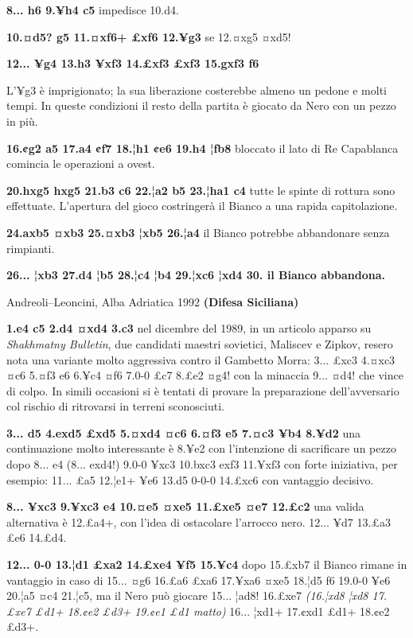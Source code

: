 \textbf{8... h6 9.¥h4 c5} impedisce 10.d4.

\textbf{10.¤d5? g5 11.¤xf6+ £xf6 12.¥g3} se 12.¤xg5 ¤xd5!

\textbf{12... ¥g4 13.h3 ¥xf3 14.£xf3 £xf3 15.gxf3 f6}


L'¥g3 è imprigionato; la sua liberazione costerebbe almeno un pedone e
molti tempi. In queste condizioni il resto della partita è giocato da
Nero con un pezzo in più.

\textbf{16.¢g2 a5 17.a4 ¢f7 18.¦h1 ¢e6 19.h4 ¦fb8} bloccato il lato di
Re Capablanca comincia le operazioni a ovest.

\textbf{20.hxg5 hxg5 21.b3 c6 22.¦a2 b5 23.¦ha1 c4} tutte le spinte di
rottura sono effettuate. L'apertura del gioco costringerà il Bianco a
una rapida capitolazione.

\textbf{24.axb5 ¤xb3 25.¤xb3 ¦xb5 26.¦a4} il Bianco potrebbe abbandonare
senza rimpianti.

\textbf{26... ¦xb3 27.d4 ¦b5 28.¦c4 ¦b4 29.¦xc6 ¦xd4 30. il Bianco
abbandona.}

Andreoli--Leoncini, Alba Adriatica 1992 \textbf{(Difesa Siciliana)}

\textbf{1.e4 c5 2.d4 ¤xd4 3.c3} nel dicembre del 1989, in un articolo
apparso su \emph{Shakhmatny Bulletin}, due candidati maestri sovietici,
Maliscev e Zipkov, resero nota una variante molto aggressiva contro il
Gambetto Morra: 3... £xc3 4.¤xc3 ¤c6 5.¤f3 e6 6.¥c4 ¤f6 7.0-0 £c7 8.£e2
¤g4! con la minaccia 9... ¤d4! che vince di colpo. In simili occasioni
si è tentati di provare la preparazione dell'avversario col rischio di
ritrovarsi in terreni sconosciuti.

\textbf{3... d5 4.exd5 £xd5 5.¤xd4 ¤c6 6.¤f3 e5 7.¤c3 ¥b4 8.¥d2} una
continuazione molto interessante è 8.¥e2 con l'intenzione di sacrificare
un pezzo dopo 8... e4 (8... exd4!) 9.0-0 ¥xc3 10.bxc3 exf3 11.¥xf3 con
forte iniziativa, per esempio: 11... £a5 12.¦e1+ ¥e6 13.d5 0-0-0 14.£xc6
con vantaggio decisivo.

\textbf{8... ¥xc3 9.¥xc3 e4 10.¤e5 ¤xe5 11.£xe5 ¤e7 12.£c2} una valida
alternativa è 12.£a4+, con l'idea di ostacolare l'arrocco nero. 12...
¥d7 13.£a3 £e6 14.£d4.

\textbf{12... 0-0 13.¦d1 £xa2 14.£xe4 ¥f5 15.¥c4} dopo 15.£xb7 il Bianco
rimane in vantaggio in caso di 15... ¤g6 16.£a6 £xa6 17.¥xa6 ¤xe5 18.¦d5
f6 19.0-0 ¥e6 20.¦a5 ¤c4 21.¦c5, ma il Nero può giocare 15... ¦ad8!
16.£xe7 \emph{(16.¦xd8 ¦xd8 17.£xe7 £d1+ 18.¢e2 £d3+ 19.¢e1 £d1 matto)}
16... ¦xd1+ 17.¢xd1 £d1+ 18.¢e2 £d3+.

